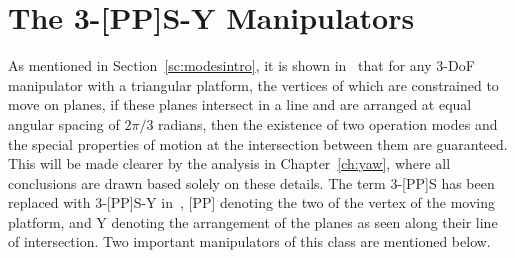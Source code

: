 \documentclass[DD]{iitmdiss}
\newcommand{\mref}[1]{\ref{#1}}
\newcommand{\mcite}[1]{\cite{#1}}
\newcommand{\mlabel}[1]{\label{#1}}
\begin{document}
\section{The 3-[PP]S-Y Manipulators} \mlabel{sc:rpsmodes}
%
As mentioned in Section~\mref{sc:modesintro}, it is shown in~\mcite{bonev2008} that for any 3-DoF manipulator with a triangular platform, the vertices of which are constrained to move on planes, if these planes intersect in a line and are arranged at equal angular spacing of $2\pi/3$ radians, then the existence of two operation modes and the special properties of motion at the intersection between them are guaranteed. This will be made clearer by the analysis in Chapter~\mref{ch:yaw}, where all conclusions are drawn based solely on these details. The term 3-[PP]S has been replaced with 3-[PP]S-Y in~\mcite{nayak2018b}, [PP] denoting the two \dofs of the vertex of the moving platform, and Y denoting the arrangement of the planes as seen along their line of intersection. Two important manipulators of this class are mentioned below.
%
\end{document}
